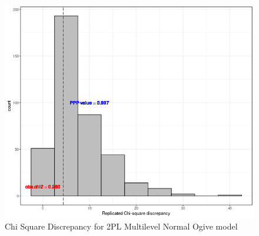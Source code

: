 \documentclass[12pt]{article}
\begin{document}
\begin{figure}[h]
\vspace{-0.5cm}
  \centering
  \includegraphics[width=1\columnwidth]{Plots/Plots_2PL_mlirt_Ogive_NC/chi_square.png}
  \caption{Chi Square Discrepancy for 2PL Multilevel Normal Ogive model}
  \label{2pl_ogive_nc_mlirt_chi_squar}
\end{figure}
\end{document}
